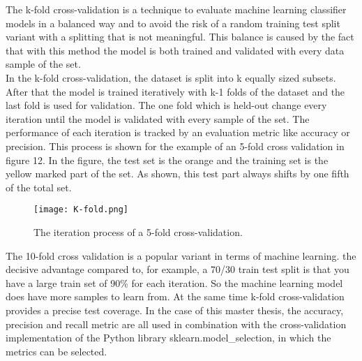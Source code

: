 \documentclass[../masterarbeit.tex]{subfiles}
\begin{document}
The k-fold cross-validation is a technique to evaluate machine learning classifier models in a balanced way and to avoid the risk of a random training test split variant with a splitting that is not meaningful. This balance is caused by the fact that with this method the model is both trained and validated with every data sample of the set. \autocite[]{Refaeilzadeh2009} \\
In the k-fold cross-validation, the dataset is split into k equally sized subsets. After that the model is trained iteratively with k-1 folds of the dataset and the last fold is used for validation. The one fold which is held-out change every iteration until the model is validated with every sample of the set. The performance of each iteration is tracked by an evaluation metric like accuracy or precision. This process is shown for the example of an 5-fold cross validation in figure 12. In the figure, the test set is the orange and the training set is the yellow marked part of the set. As shown, this test part always shifts by one fifth of the total set. \autocite[]{Refaeilzadeh2009} \\
\begin{figure}[h]
    \centering
    \texttt{[image: K-fold.png]}
    \caption{The iteration process of a 5-fold cross-validation.}
\end{figure}
The 10-fold cross validation is a popular variant in terms of machine learning. the decisive advantage compared to, for example, a 70/30 train test split is that you have a large train set of 90\% for each iteration. So the machine learning model does have more samples to learn from. At the same time k-fold cross-validation provides a precise test coverage. \autocite[]{analyticsvidhya_cross_validation:2022}
In the case of this master thesis, the accuracy, precision and recall metric are all used in combination with the cross-validation implementation of the Python library sklearn.model\_selection, in which the metrics can be selected. 
\end{document}
